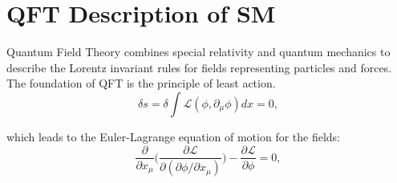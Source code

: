 

\section{QFT Description of SM}
\label{sec:relatedWorks:qft}


Quantum Field Theory combines special relativity and quantum mechanics to describe the Lorentz invariant rules for fields representing particles and forces. The foundation of QFT is the principle of least action.
\begin{equation}
    \delta s = \delta \int \mathcal{L}(\phi, \partial_\mu \phi) dx = 0,
    \label{eqn:relatedWorks:qft:leastAction}
\end{equation}

\noindent which leads to the Euler-Lagrange equation of motion for the fields:
\begin{equation}
    \frac{\partial}{\partial x_\mu} \bigg( \frac{\partial \mathcal{L}}{\partial(\partial \phi / \partial x_\mu)}\bigg) - \frac{\partial \mathcal{L}}{ \partial \phi} = 0,
    \label{eqn:relatedWorks:qft:lagrangeEoM}
\end{equation}

